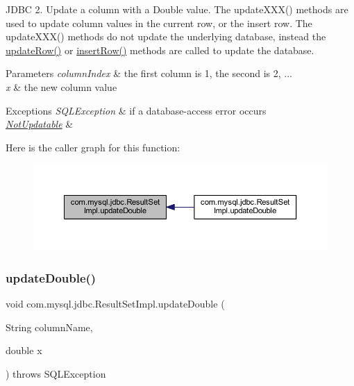 J\+D\+BC 2. Update a column with a Double value. The update\+X\+X\+X() methods are used to update column values in the current row, or the insert row. The update\+X\+X\+X() methods do not update the underlying database, instead the \mbox{\hyperlink{classcom_1_1mysql_1_1jdbc_1_1_result_set_impl_a2842d32292d023aaeeafedeed3322981}{update\+Row()}} or \mbox{\hyperlink{classcom_1_1mysql_1_1jdbc_1_1_result_set_impl_a78e304e3279cbcf60392f18c1385e3bf}{insert\+Row()}} methods are called to update the database.


\begin{DoxyParams}{Parameters}
{\em column\+Index} & the first column is 1, the second is 2, ... \\
\hline
{\em x} & the new column value\\
\hline
\end{DoxyParams}

\begin{DoxyExceptions}{Exceptions}
{\em S\+Q\+L\+Exception} & if a database-\/access error occurs \\
\hline
{\em \mbox{\hyperlink{classcom_1_1mysql_1_1jdbc_1_1_not_updatable}{Not\+Updatable}}} & \\
\hline
\end{DoxyExceptions}
Here is the caller graph for this function\+:
\nopagebreak
\begin{figure}[H]
\begin{center}
\leavevmode
\includegraphics[width=350pt]{classcom_1_1mysql_1_1jdbc_1_1_result_set_impl_a96ad2b9447082dceb1828acb8377645e_icgraph}
\end{center}
\end{figure}
\mbox{\label{classcom_1_1mysql_1_1jdbc_1_1_result_set_impl_aadcc20dabbb79344eed654cbdccf42d2}} 
\subsubsection{\texorpdfstring{update\+Double()}{updateDouble()}\hspace{0.1cm}{\footnotesize\ttfamily [2/2]}}
{\footnotesize\ttfamily void com.\+mysql.\+jdbc.\+Result\+Set\+Impl.\+update\+Double (\begin{DoxyParamCaption}\item[{String}]{column\+Name,  }\item[{double}]{x }\end{DoxyParamCaption}) throws S\+Q\+L\+Exception}

